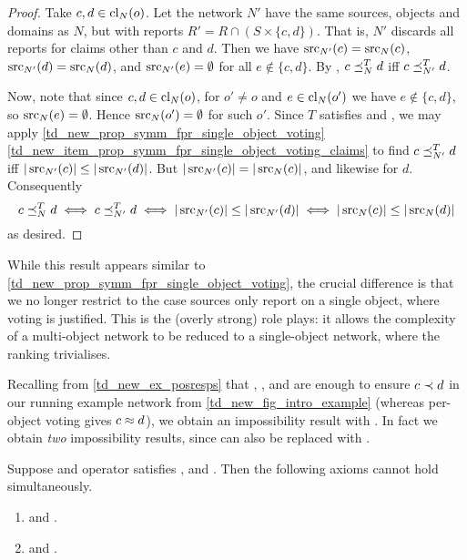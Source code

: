 \begin{proof}
    Take $c, d \in \operatorname{cl}_N(o)$. Let the network $N'$ have the same sources,
    objects and domains as $N$, but with reports $R' = R \cap (S \times \{c,
    d\})$. That is, $N'$ discards all reports for claims other than $c$ and
    $d$. Then we have $\operatorname{src}_{N'}(c) = \operatorname{src}_N(c)$, $\operatorname{src}_{N'}(d) = \operatorname{src}_N(d)$,
    and $\operatorname{src}_{N'}(e) = \emptyset$ for all $e \notin \{c, d\}$. By
    \classicalindependence{}, $c \preceq_N^T d$ iff $c \preceq_{N'}^T d$.

    Now, note that since $c, d \in \operatorname{cl}_N(o)$, for $o' \ne o$ and $e \in
    \operatorname{cl}_N(o')$ we have $e \notin \{c, d\}$, so $\operatorname{src}_N(e) = \emptyset$.
    Hence $\operatorname{src}_N(o') = \emptyset$ for such $o'$. Since $T$ satisfies
    \symmetry{} and \freshposresp{}, we may apply
    \cref{td_new_prop_symm_fpr_single_object_voting}
    \cref{td_new_item_prop_symm_fpr_single_object_voting_claims} to find $c
    \preceq_{N'}^T d$ iff $|\operatorname{src}_{N'}(c)| \le |\operatorname{src}_{N'}(d)|$. But $|\operatorname{src}_{N'}(c)|
    = |\operatorname{src}_N(c)|$, and likewise for $d$. Consequently
    \[
        c \preceq_N^T d
        \iff c \preceq_{N'}^T d
        \iff |\operatorname{src}_{N'}(c)| \le |\operatorname{src}_{N'}(d)|
        \iff |\operatorname{src}_{N}(c)| \le |\operatorname{src}_{N}(d)|
    \]
    as desired.
\end{proof}

While this result appears similar to
\cref{td_new_prop_symm_fpr_single_object_voting}, the crucial difference is
that we no longer restrict to the case sources only report on a single object,
where voting is justified. This is the (overly strong) role
\classicalindependence{} plays: it allows the complexity of a multi-object
network to be reduced to a single-object network, where the ranking
trivialises.

Recalling from \cref{td_new_ex_posresps} that \claimcoherence{}, \symmetry{},
\freshposresp{} and \sourceposresp{} are enough to ensure $c \prec d$ in our
running example network from \cref{td_new_fig_intro_example} (whereas
per-object voting gives $c \approx d$), we obtain an impossibility result with
\classicalindependence{}. In fact we obtain \emph{two} impossibility results,
since \sourceposresp{} can also be replaced with \sourcecoherence{}.

\begin{theorem}
    Suppose and operator satisfies \symmetry{}, \claimcoherence{} and
    \freshposresp{}. Then the following axioms cannot hold simultaneously.
    \begin{enumerate}
        \item \sourceposresp{} and \classicalindependence{}.
        \item \sourcecoherence{} and \classicalindependence{}.
    \end{enumerate}
\end{theorem}

